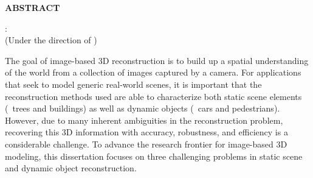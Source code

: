 
\begin{center}
\vspace*{46pt}
\textbf{ABSTRACT}
\vspace{4pt}

\begin{singlespace}
\thesisauthor: \thesistitle \\
(Under the direction of \thesisadvisors)
\vspace{10pt}
\end{singlespace}
\end{center}





The goal of image-based 3D reconstruction is to build up a spatial understanding of the world from a collection of images captured by a camera. For applications that seek to model generic real-world scenes, it is important that the reconstruction methods used are able to characterize both static scene elements (\eg~trees and buildings) as well as dynamic objects (\eg~cars and pedestrians). However, due to many inherent ambiguities in the reconstruction problem, recovering this 3D information with accuracy, robustness, and efficiency is a considerable challenge. To advance the research frontier for image-based 3D modeling, this dissertation focuses on three challenging problems in static scene and dynamic object reconstruction. 

